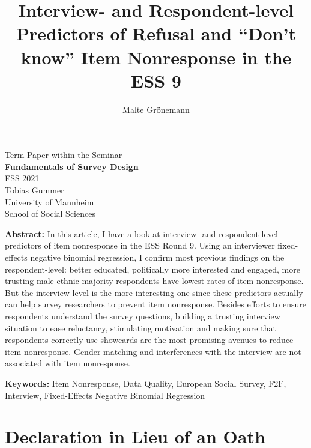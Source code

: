 \documentclass[a4paper,12pt]{article}
\title{Interview- and Respondent-level Predictors of Refusal and ``Don't know'' Item Nonresponse in the ESS 9}
\author{Malte Grönemann}
\begin{document}
\begin{titlepage}
\maketitle
\thispagestyle{empty} 

\large

Term Paper within the Seminar \\
\textbf{Fundamentals of Survey Design}  \\
FSS 2021 \\
Tobias Gummer\\
University of Mannheim \\
School of Social Sciences

\bigskip

\normalsize

\textbf{Abstract:} In this article, I have a look at interview- and respondent-level predictors of item nonresponse in the ESS Round 9. Using an interviewer fixed-effects negative binomial regression, I confirm most previous findings on the respondent-level: better educated, politically more interested and engaged, more trusting male ethnic majority respondents have lowest rates of item nonresponse. But the interview level is the more interesting one since these predictors actually can help survey researchers to prevent item nonresponse. Besides efforts to ensure respondents understand the survey questions, building a trusting interview situation to ease reluctancy, stimulating motivation and making sure that respondents correctly use showcards are the most promising avenues to reduce item nonresponse. Gender matching and interferences with the interview are not associated with item nonresponse.

\bigskip

\textbf{Keywords:} Item Nonresponse, Data Quality, European Social Survey, F2F, Interview, Fixed-Effects Negative Binomial Regression

\end{titlepage}


\section*{Declaration in Lieu of an Oath}

\setcounter{page}{0}
\thispagestyle{empty} 
\end{document}
